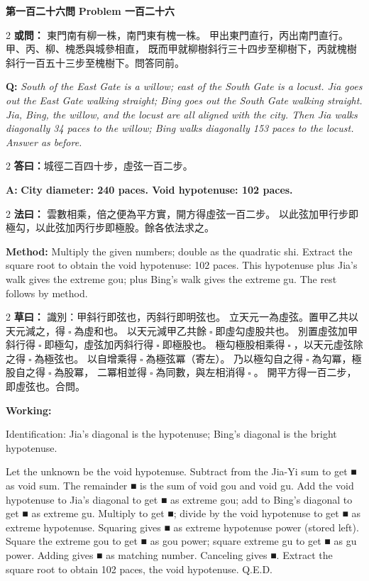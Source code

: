 \documentclass[11pt,a4paper]{article}
\let\origsquare\square
\renewcommand{\square}{\ensuremath{\origsquare}}%
\newcommand{\wen}[1]{%
  \par\vspace{0.5em}%
  \noindent\textcolor{problemcolor}{\textbf{第#1問}}%
  \hfill\textcolor{problemcolor}{\textbf{Problem #1}}\par\nopagebreak%
  \vspace{0.3em}%
}
\newcommand{\owen}[1]{%
  \noindent\textcolor{problemcolor}{\textbf{或問：}}{\tradfont #1}\par\nopagebreak%
}
\newcommand{\oweneng}[1]{%
  \noindent\textcolor{engcolor}{\textbf{Q: }}{\itshape #1}\par\nopagebreak%
}
\newcommand{\fayue}[1]{%
  \noindent\textcolor{methodcolor}{\textbf{法曰：}}{\tradfont #1}\par\nopagebreak%
}
\newcommand{\fayueeng}[1]{%
  \noindent\textcolor{engcolor}{\textbf{Method: }}{#1}\par\nopagebreak%
}
\newcommand{\tsaoyue}[1]{%
  \noindent\textcolor{workcolor}{\textbf{草曰：}}{\tradfont #1}\par%
}
\newcommand{\tsaoyueeng}[1]{%
  \noindent\textcolor{engcolor}{\textbf{Working: }}{\small #1}\par%
}
\newcommand{\dayue}[1]{%
  \noindent\textcolor{anscolor}{\textbf{答曰：}}{\tradfont #1}\par\nopagebreak%
}
\newcommand{\dayueeng}[1]{%
  \noindent\textcolor{engcolor}{\textbf{A: }}{\bfseries #1}\par\nopagebreak%
}
\begin{document}
\vspace{0.5cm}

\wen{一百二十六}

\begin{paracol}{2}
\owen{%
東門南有柳一株，南門東有槐一株。
甲出東門直行，丙出南門直行。
甲、丙、柳、槐悉與城參相直，
既而甲就柳樹斜行三十四步至柳樹下，丙就槐樹斜行一百五十三步至槐樹下。問答同前。}
\switchcolumn
\oweneng{%
South of the East Gate is a willow; east of the South Gate is a locust. Jia goes out the East Gate walking straight; Bing goes out the South Gate walking straight. Jia, Bing, the willow, and the locust are all aligned with the city. Then Jia walks diagonally 34 paces to the willow; Bing walks diagonally 153 paces to the locust. Answer as before.}
\end{paracol}

\begin{paracol}{2}
\dayue{城徑二百四十步，虛弦一百二步。}
\switchcolumn
\dayueeng{City diameter: 240 paces. Void hypotenuse: 102 paces.}
\end{paracol}

\begin{paracol}{2}
\fayue{%
雲數相乘，倍之便為平方實，開方得虛弦一百二步。
以此弦加甲行步即極勾，以此弦加丙行步即極股。餘各依法求之。}
\switchcolumn
\fayueeng{%
Multiply the given numbers; double as the quadratic shi. Extract the square root to obtain the void hypotenuse: 102 paces. This hypotenuse plus Jia's walk gives the extreme gou; plus Bing's walk gives the extreme gu. The rest follows by method.}
\end{paracol}

\begin{paracol}{2}
\tsaoyue{%
識別：甲斜行即弦也，丙斜行即明弦也。
立天元一為虛弦。置甲乙共以天元減之，得$ \; \square \; $為虛和也。
以天元減甲乙共餘$ \; \square \; $即虛勾虛股共也。
別置虛弦加甲斜行得$ \; \square \; $即極勾，虛弦加丙斜行得$ \; \square \; $即極股也。
極勾極股相乘得$ \; \square \; $，以天元虛弦除之得$ \; \square \; $為極弦也。
以自增乘得$ \; \square \; $為極弦冪（寄左）。
乃以極勾自之得$ \; \square \; $為勾冪，極股自之得$ \; \square \; $為股冪，
二冪相並得$ \; \square \; $為同數，與左相消得$ \; \square \; $。
開平方得一百二步，即虛弦也。合問。}
\switchcolumn
\tsaoyueeng{%
Identification: Jia's diagonal is the hypotenuse; Bing's diagonal is the bright hypotenuse.

Let the unknown be the void hypotenuse. Subtract from the Jia-Yi sum to get ■ as void sum. The remainder ■ is the sum of void gou and void gu. Add the void hypotenuse to Jia's diagonal to get ■ as extreme gou; add to Bing's diagonal to get ■ as extreme gu. Multiply to get ■; divide by the void hypotenuse to get ■ as extreme hypotenuse. Squaring gives ■ as extreme hypotenuse power (stored left). Square the extreme gou to get ■ as gou power; square extreme gu to get ■ as gu power. Adding gives ■ as matching number. Canceling gives ■. Extract the square root to obtain 102 paces, the void hypotenuse. Q.E.D.}
\end{paracol}
\end{document}
